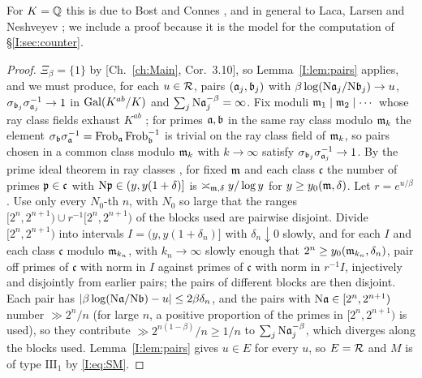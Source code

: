 For $K=\mathbb{Q}$ this is due to Bost and Connes \cite{BC}, and in general to Laca, Larsen and
Neshveyev \cite{LLN}; we include a proof because it is the model for the computation of
\S\ref{I:sec:counter}.

\begin{proof}
$\Xi_\beta=\{1\}$ by [Ch.~\ref{ch:Main}, Cor.~3.10], so Lemma~\ref{I:lem:pairs} applies, and we must
produce, for each $u\in\mathcal{R}$, pairs $(\mathfrak{a}_j,\mathfrak{b}_j)$ with $\beta\log(\mathrm{N}\mathfrak{a}_j/\mathrm{N}\mathfrak{b}_j)\to u$,
$\sigma_{\mathfrak{b}_j}\sigma_{\mathfrak{a}_j}^{-1}\to1$ in $\operatorname{Gal}(K^{ab}/K)$ and $\sum_j\mathrm{N}\mathfrak{a}_j^{-\beta}=\infty$.
Fix moduli $\mathfrak{m}_1\mid\mathfrak{m}_2\mid\cdots$ whose ray class fields exhaust $K^{ab}$
\cite[Ch.~VI]{Neukirch}; for primes
$\mathfrak{a},\mathfrak{b}$ in the same ray class modulo $\mathfrak{m}_k$ the element
$\sigma_{\mathfrak{b}}\sigma_{\mathfrak{a}}^{-1}=\operatorname{Frob}_{\mathfrak{a}}\operatorname{Frob}_{\mathfrak{b}}^{-1}$ is trivial on the ray class field of
$\mathfrak{m}_k$, so pairs chosen in a common class modulo $\mathfrak{m}_{k}$ with $k\to\infty$ satisfy
$\sigma_{\mathfrak{b}_j}\sigma_{\mathfrak{a}_j}^{-1}\to1$. By the prime ideal theorem in ray classes
\cite{Landau}, for fixed $\mathfrak{m}$ and each class $\mathfrak c$ the number of primes
$\mathfrak{p}\in\mathfrak c$ with $\mathrm{N}\mathfrak{p}\in(y,y(1+\delta)]$ is $\asymp_{\mathfrak{m},\delta}y/\log y$ for
$y\ge y_0(\mathfrak{m},\delta)$. Let $r=e^{u/\beta}$. Use only every $N_0$-th $n$, with $N_0$ so large that the ranges
$[2^n,2^{n+1})\cup r^{-1}[2^n,2^{n+1})$ of the blocks used are pairwise disjoint. Divide
$[2^n,2^{n+1})$ into intervals $I=(y,y(1+\delta_n)]$ with $\delta_n\downarrow0$ slowly, and
for each $I$ and each class
$\mathfrak c$ modulo $\mathfrak{m}_{k_n}$, with $k_n\to\infty$ slowly enough that
$2^n\ge y_0(\mathfrak{m}_{k_n},\delta_n)$, pair off primes of $\mathfrak c$ with norm in $I$ against
primes of $\mathfrak c$ with norm in $r^{-1}I$, injectively and disjointly from earlier
pairs; the pairs of different blocks are then disjoint. Each pair has
$|\beta\log(\mathrm{N}\mathfrak{a}/\mathrm{N}\mathfrak{b})-u|\le2\beta\delta_n$, and the pairs with
$\mathrm{N}\mathfrak{a}\in[2^n,2^{n+1})$ number $\gg2^n/n$ (for large $n$, a positive proportion of the primes
in $[2^n,2^{n+1})$ is used), so they contribute $\gg2^{n(1-\beta)}/n\ge1/n$ to
$\sum_j\mathrm{N}\mathfrak{a}_j^{-\beta}$, which diverges along the blocks used. Lemma~\ref{I:lem:pairs} gives $u\in E$
for every $u$, so $E=\mathcal{R}$ and $M$ is of type $\mathrm{III}_1$ by \eqref{I:eq:SM}.
\end{proof}

